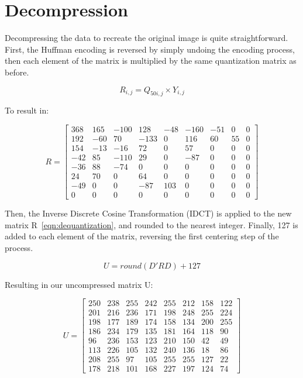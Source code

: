 \documentclass[11pt]{article}
\begin{document}
\section{Decompression}
\label{sec: decompression}

Decompressing the data to recreate the original image is quite straightforward.
First, the Huffman encoding is reversed by simply undoing the encoding process, then each element of the matrix is multiplied by the same quantization matrix as before.

\begin{equation}
  \label{eqn:decompression}
  R_{i,j} = Q_{50i,j} \times Y_{i,j}
\end{equation}
\newpage

To result in:

\begin{equation}
  \label{eqn:dequantization}
  R = \begin{bmatrix}
    368 & 165 & -100 & 128 & -48 & -160 & -51 & 0 & 0 \\
    192 & -60 & 70 & -133 & 0 & 116 & 60 & 55 & 0 \\
    154 & -13 & -16 & 72 & 0 & 57 & 0 & 0 & 0 \\
    -42 & 85 & -110 & 29 & 0 & -87 & 0 & 0 & 0 \\
    -36 & 88 & -74 & 0 & 0 & 0 & 0 & 0 & 0 \\
    24 & 70 & 0 & 64 & 0 & 0 & 0 & 0 & 0 \\
    -49 & 0 & 0 & -87 & 103 & 0 & 0 & 0 & 0 \\
    0 & 0 & 0 & 0 & 0 & 0 & 0 & 0 & 0
  \end{bmatrix}
\end{equation}

Then, the Inverse Discrete Cosine Transformation (IDCT) is applied to the new matrix R~\eqref{eqn:dequantization}, and rounded to the nearest integer.
Finally, 127 is added to each element of the matrix, reversing the first centering step of the process.

\begin{equation}
  \label{eqn:idct}
  U = round(D'RD) + 127
\end{equation}

Resulting in our uncompressed matrix U:

\begin{equation}
  \label{eqn:decompressed}
  U = \begin{bmatrix}
    250 & 238 & 255 & 242 & 255 & 212 & 158 & 122 \\
    201 & 216 & 236 & 171 & 198 & 248 & 255 & 224 \\
    198 & 177 & 189 & 174 & 158 & 134 & 200 & 255 \\
    186 & 234 & 179 & 135 & 181 & 164 & 118 & 90 \\
    96 & 236 & 153 & 123 & 210 & 150 & 42 & 49 \\
    113 & 226 & 105 & 132 & 240 & 136 & 18 & 86 \\
    208 & 255 & 97 & 105 & 255 & 255 & 127 & 22 \\
    178 & 218 & 101 & 168 & 227 & 197 & 124 & 74
  \end{bmatrix}
\end{equation}
\end{document}
